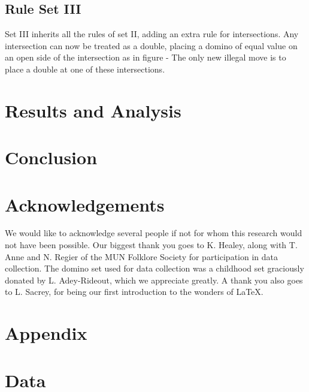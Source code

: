 \documentclass{article}
\begin{document}
\subsection{Rule Set III}
Set III inherits all the rules of set II, adding an extra rule for intersections. Any intersection can now be treated as a double, placing a domino of equal value on an open side of the intersection as in figure - %
The only new illegal move is to place a double at one of these intersections.

\section{Results and Analysis}
\section{Conclusion}

\section*{Acknowledgements}
We would like to acknowledge several people if not for whom this research would not have been possible. Our biggest thank you goes to K. Healey, along with T. Anne and N. Regier of the MUN Folklore Society for participation in data collection. The domino set used for data collection was a childhood set graciously donated by L. Adey-Rideout, which we appreciate greatly. A thank you also goes to L. Sacrey, for being our first introduction to the wonders of \LaTeX.

\section*{Appendix}
\appendix
\section{Data}\label{A}



\end{document}
